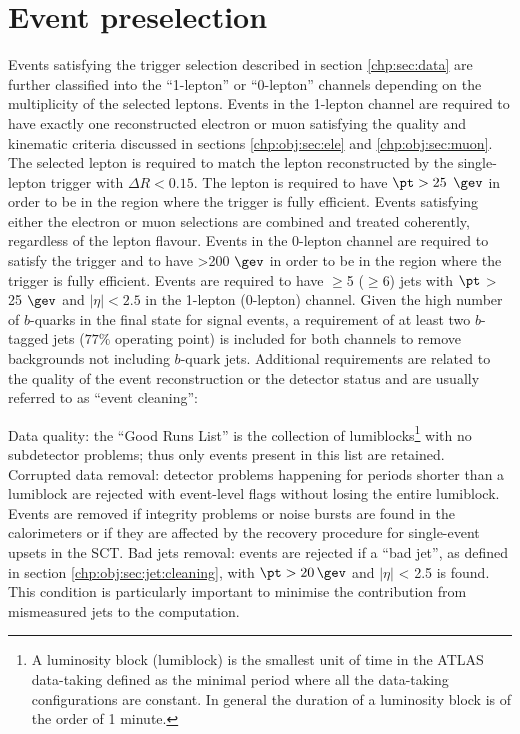 \section{Event preselection}
\label{sec:vlq:presel}
Events satisfying the trigger selection described in section \ref{chp:sec:data} are further classified into the ``1-lepton'' or ``0-lepton'' channels depending on the multiplicity of the selected leptons. Events in the 1-lepton channel are required to have exactly one reconstructed electron or muon satisfying the quality and kinematic criteria discussed in sections \ref{chp:obj:sec:ele} and \ref{chp:obj:sec:muon}. The selected lepton is required to match the lepton reconstructed by the single-lepton trigger with $\Delta R<0.15$. 
The lepton is required to have $\pt>25$ $\gev$ in order to be in the region where the trigger is fully efficient. Events satisfying either the electron or muon selections are combined and treated coherently, regardless of the lepton flavour. Events in the 0-lepton channel are required to satisfy the \MET trigger and to have \MET >200 $\gev$ in order to be in the region where the trigger is fully efficient. Events are required to have $\ge$5 ($\ge$6) jets with $\pt$ > 25 $\gev$ and $|\eta|<2.5$ in the 1-lepton (0-lepton) channel. Given the high number of $b$-quarks in the final state for signal events, a requirement of at least two $b$-tagged jets ($77\%$ operating point) is included for both channels to remove backgrounds not including $b$-quark jets. Additional requirements are related to the quality of the event reconstruction or the detector status and are usually referred to as ``event cleaning'':

\bi
\ib Data quality:  the ``Good Runs List'' is the collection of lumiblocks\footnote{A luminosity block (lumiblock) is the smallest unit of time in the ATLAS data-taking defined as the minimal period where all the data-taking configurations are constant. In general the duration of a luminosity block is of the order of 1 minute.} with no subdetector problems; thus only events present in this list are retained.
\ib Corrupted data removal: detector problems happening for periods shorter than a lumiblock are rejected with event-level flags without losing the entire lumiblock. Events are removed if integrity problems or noise bursts are found in the calorimeters or if  they are affected by the recovery procedure for single-event upsets in the SCT.
\ib Bad jets removal: events are rejected if a ``bad jet'', as defined in section \ref{chp:obj:sec:jet:cleaning}, with $\pt > 20\,\gev$ and $|\eta|$ < 2.5 is found. This condition is particularly important to minimise the contribution from mismeasured jets to the \MET computation.
\ei

